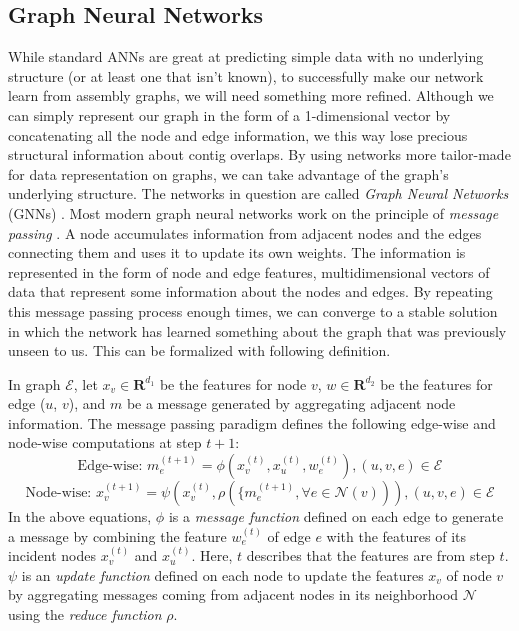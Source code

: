 \documentclass[times, utf8, diplomski, english]{fer_eng}
\begin{document}
\subsection{Graph Neural Networks}
\label{subsec:graph neural networks}

While standard ANNs are great at predicting simple data with no underlying structure (or at least one that isn't known), to successfully make our network learn from assembly graphs, we will need something more refined. Although we can simply represent our graph in the form of a 1-dimensional vector by concatenating all the node and edge information, we this way lose precious structural information about contig overlaps. By using networks more tailor-made for data representation on graphs, we can take advantage of the graph's underlying structure. The networks in question are called \textit{Graph Neural Networks} (GNNs) \cite{GNN}. Most modern graph neural networks work on the principle of \textit{message passing} \cite{message_passing}. A node accumulates information from adjacent nodes and the edges connecting them and uses it to update its own weights. The information is represented in the form of node and edge features, multidimensional vectors of data that represent some information about the nodes and edges. By repeating this message passing process enough times, we can converge to a stable solution in which the network has learned something about the graph that was previously unseen to us. This can be formalized with following definition.

In graph $\mathcal{E}$, let $x_v \in \mathbf{R}^{d_1}$ be the features for node $v$, $w \in \mathbf{R}^{d_2}$ be the features for edge ($u$, $v$), and $m$ be a message generated by aggregating adjacent node information. The message passing paradigm defines the following edge-wise and node-wise computations at step $t+1$:
\[ \textrm{Edge-wise: } m_e^{(t+1)} = \phi (x_v^{(t)}, x_u^{(t)}, w_e^{(t)}), (u, v, e) \in \mathcal{E} \]
\[ \textrm{Node-wise: } x_v^{(t+1)} = \psi (x_v^{(t)}, \rho (\{m_e^{(t+1)}, \forall e \in \mathcal{N}(v))), (u, v, e) \in \mathcal{E} \]
In the above equations, $\phi$ is a \textit{message function} defined on each edge to generate a message by combining the feature $w_e^{(t)}$ of edge $e$ with the features of its incident nodes $x_v^{(t)}$ and $x_u^{(t)}$. Here, $t$ describes that the features are from step $t$. $\psi$ is an \textit{update function} defined on each node to update the features $x_v$ of node $v$ by aggregating messages coming from adjacent nodes in its neighborhood $\mathcal{N}$ using the \textit{reduce function} $\rho$.
\end{document}

